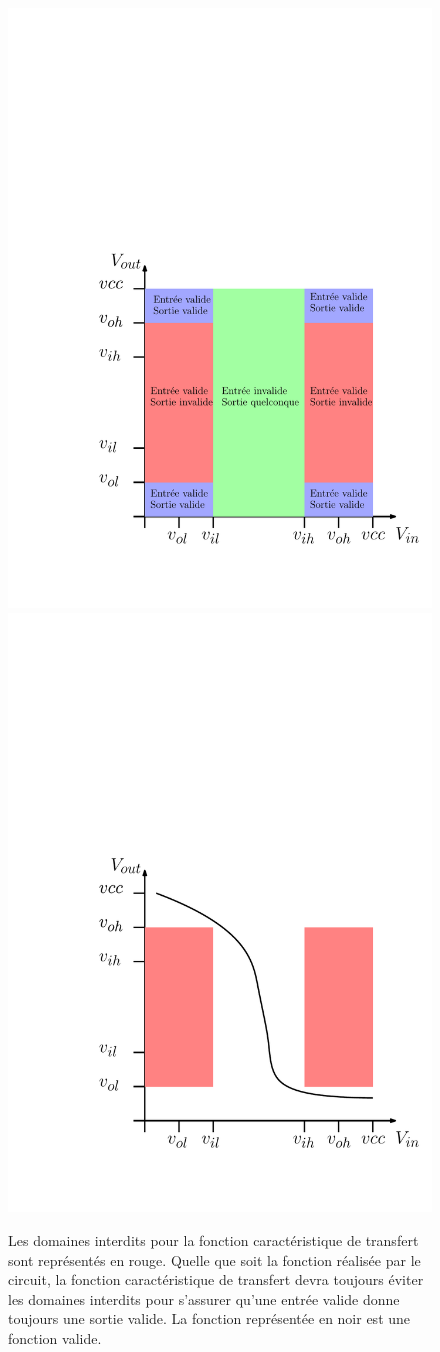 
\begin{figure}[htbp]
\centering\includegraphics[width=0.5\linewidth]{Figs/vtc_forbidden_labels.pdf}\includegraphics[width=0.5\linewidth]{Figs/vtc_forbidden.pdf}
\caption{\label{fig:VTC_forbidden} Les domaines interdits pour la fonction caractéristique de transfert sont représentés en rouge. Quelle que soit la fonction réalisée par le circuit, la fonction caractéristique de transfert devra toujours éviter les domaines interdits pour s'assurer qu'une entrée valide donne toujours une sortie valide. La fonction représentée en noir est une fonction valide.}
\end{figure}

